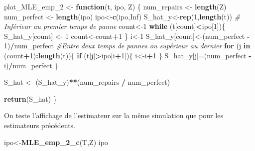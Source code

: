 \documentclass[
]{article}
\newenvironment{Shaded}{\begin{snugshade}}{\end{snugshade}}
\newcommand{\CommentTok}[1]{\textcolor[rgb]{0.56,0.35,0.01}{\textit{#1}}}
\newcommand{\ConstantTok}[1]{\textcolor[rgb]{0.56,0.35,0.01}{#1}}
\newcommand{\ControlFlowTok}[1]{\textcolor[rgb]{0.13,0.29,0.53}{\textbf{#1}}}
\newcommand{\DecValTok}[1]{\textcolor[rgb]{0.00,0.00,0.81}{#1}}
\newcommand{\FunctionTok}[1]{\textcolor[rgb]{0.13,0.29,0.53}{\textbf{#1}}}
\newcommand{\NormalTok}[1]{#1}
\newcommand{\OtherTok}[1]{\textcolor[rgb]{0.56,0.35,0.01}{#1}}
\newcommand{\SpecialCharTok}[1]{\textcolor[rgb]{0.81,0.36,0.00}{\textbf{#1}}}
\begin{document}
\begin{Shaded}
\begin{Highlighting}[]
\NormalTok{plot\_MLE\_emp\_2 }\OtherTok{\textless{}{-}} \ControlFlowTok{function}\NormalTok{(t, ipo, Z)}
\NormalTok{\{}
\NormalTok{  num\_repairs }\OtherTok{\textless{}{-}} \FunctionTok{length}\NormalTok{(Z)}
\NormalTok{  num\_perfect }\OtherTok{\textless{}{-}} \FunctionTok{length}\NormalTok{(ipo)}
\NormalTok{  ipo}\OtherTok{\textless{}{-}}\FunctionTok{c}\NormalTok{(ipo,}\ConstantTok{Inf}\NormalTok{)}
\NormalTok{  S\_hat\_y}\OtherTok{\textless{}{-}}\FunctionTok{rep}\NormalTok{(}\DecValTok{1}\NormalTok{,}\FunctionTok{length}\NormalTok{(t))}
  \CommentTok{\# Inférieur au premier temps de panne}
\NormalTok{  count}\OtherTok{\textless{}{-}}\DecValTok{1}
  \ControlFlowTok{while}\NormalTok{ (t[count]}\SpecialCharTok{\textless{}}\NormalTok{ipo[}\DecValTok{1}\NormalTok{])\{}
\NormalTok{    S\_hat\_y[count] }\OtherTok{\textless{}{-}} \DecValTok{1}
\NormalTok{    count}\OtherTok{\textless{}{-}}\NormalTok{count}\SpecialCharTok{+}\DecValTok{1}
\NormalTok{  \}}
\NormalTok{  i}\OtherTok{\textless{}{-}}\DecValTok{1}
\NormalTok{  S\_hat\_y[count]}\OtherTok{\textless{}{-}}\NormalTok{(num\_perfect }\SpecialCharTok{{-}} \DecValTok{1}\NormalTok{)}\SpecialCharTok{/}\NormalTok{num\_perfect}
  \CommentTok{\#Entre deux temps de pannes ou supérieur au dernier}
  \ControlFlowTok{for}\NormalTok{ (j }\ControlFlowTok{in}\NormalTok{ (count}\SpecialCharTok{+}\DecValTok{1}\NormalTok{)}\SpecialCharTok{:}\FunctionTok{length}\NormalTok{(t))\{}
    \ControlFlowTok{if}\NormalTok{ (t[j]}\SpecialCharTok{\textgreater{}}\NormalTok{ipo[i}\SpecialCharTok{+}\DecValTok{1}\NormalTok{])\{}
\NormalTok{      i}\OtherTok{\textless{}{-}}\NormalTok{i}\SpecialCharTok{+}\DecValTok{1}
\NormalTok{    \}}
\NormalTok{    S\_hat\_y[j]}\OtherTok{=}\NormalTok{(num\_perfect }\SpecialCharTok{{-}}\NormalTok{ i)}\SpecialCharTok{/}\NormalTok{num\_perfect}
\NormalTok{  \}}
  
\NormalTok{  S\_hat }\OtherTok{\textless{}{-}}\NormalTok{ (S\_hat\_y)}\SpecialCharTok{**}\NormalTok{(num\_repairs }\SpecialCharTok{/}\NormalTok{ num\_perfect)}
  
  \FunctionTok{return}\NormalTok{(S\_hat)}
\NormalTok{\}}
\end{Highlighting}
\end{Shaded}

On teste l'affichage de l'estimateur sur la même simulation que pour les
estimateurs précédents.

\begin{Shaded}
\begin{Highlighting}[]
\NormalTok{ipo}\OtherTok{\textless{}{-}}\FunctionTok{MLE\_emp\_2\_c}\NormalTok{(T,Z)}
\NormalTok{ipo}
\end{Highlighting}
\end{Shaded}
\end{document}
